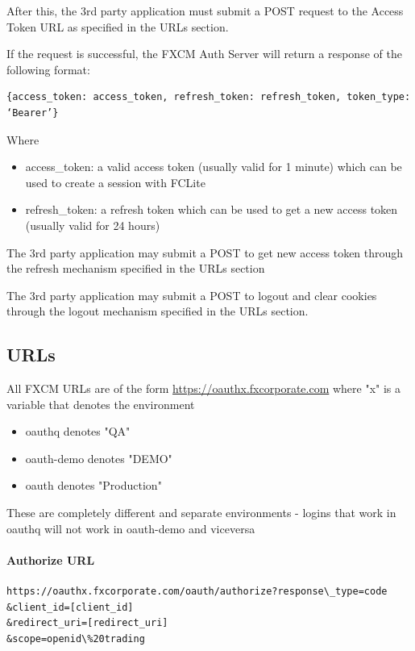 \documentclass[11pt]{article}
\begin{document}
After this, the 3rd party application must submit a POST request to the Access Token URL as specified in the URLs section.

If the request is successful, the FXCM Auth Server will return a response of the following format:

\begin{verbatim}
{access_token: access_token, refresh_token: refresh_token, token_type: ‘Bearer’}
\end{verbatim}

Where

\begin{itemize}
    \item access\_token: a valid access token (usually valid for 1 minute) which can be used to create a session with FCLite
    \item refresh\_token: a refresh token which can be used to get a new access token (usually valid for 24 hours)
\end{itemize}

The 3rd party application may submit a POST to get new access token through the refresh mechanism specified in the URLs section

The 3rd party application may submit a POST to logout and clear cookies through the logout mechanism specified in the URLs section.

\subsection{URLs}
All FXCM URLs are of the form \url{https://oauthx.fxcorporate.com} where "x" is a variable that denotes the environment

\begin{itemize}
    \item oauthq denotes "QA"
    \item oauth-demo denotes "DEMO"
    \item oauth denotes "Production"
\end{itemize}

These are completely different and separate environments - logins that work in oauthq will not work in oauth-demo and viceversa

\paragraph{Authorize URL}

\begin{verbatim}
https://oauthx.fxcorporate.com/oauth/authorize?response\_type=code
&client_id=[client_id]
&redirect_uri=[redirect_uri]
&scope=openid\%20trading
\end{verbatim}
\end{document}
